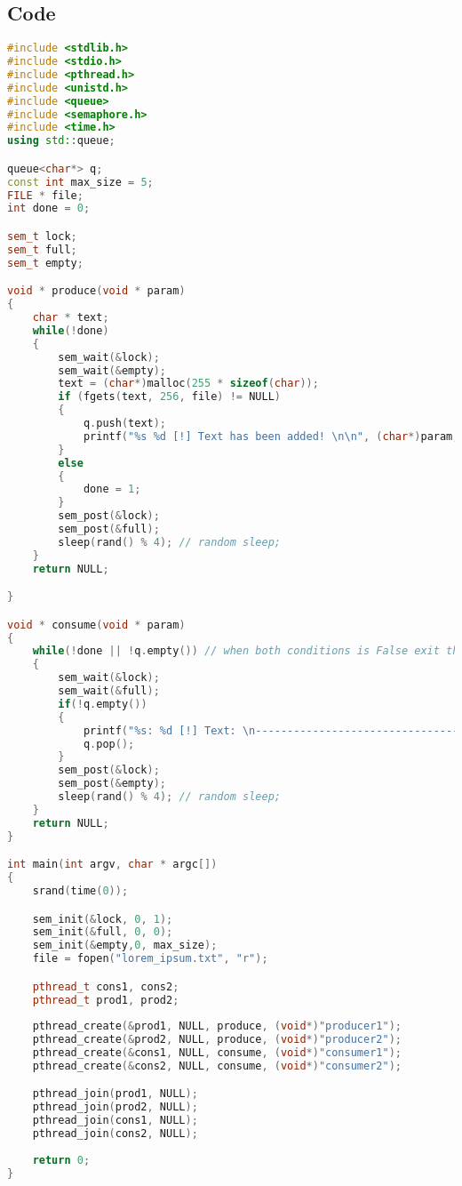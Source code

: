 \documentclass{article}
\begin{document}
\subsection{Code}
\begin{lstlisting}[language=C++]
#include <stdlib.h>
#include <stdio.h>
#include <pthread.h>
#include <unistd.h>
#include <queue>
#include <semaphore.h>
#include <time.h>
using std::queue;

queue<char*> q;
const int max_size = 5;
FILE * file;
int done = 0;

sem_t lock;
sem_t full;
sem_t empty;

void * produce(void * param)
{
	char * text;
	while(!done)
	{
		sem_wait(&lock);
		sem_wait(&empty);
		text = (char*)malloc(255 * sizeof(char));
		if (fgets(text, 256, file) != NULL)
		{
			q.push(text);
			printf("%s %d [!] Text has been added! \n\n", (char*)param, pthread_self());
		}
		else
		{
			done = 1;
		}
		sem_post(&lock);
		sem_post(&full);
		sleep(rand() % 4); // random sleep;
	}
	return NULL;

}

void * consume(void * param)
{
	while(!done || !q.empty()) // when both conditions is False exit the loop;
	{
		sem_wait(&lock);
		sem_wait(&full);
		if(!q.empty())
		{
			printf("%s: %d [!] Text: \n----------------------------------\n %s-------------------------------------\n",(char*)param , pthread_self(), q.front());
			q.pop();
		}
		sem_post(&lock);
		sem_post(&empty);
		sleep(rand() % 4); // random sleep;
	}
	return NULL;
}

int main(int argv, char * argc[])
{
	srand(time(0));

	sem_init(&lock, 0, 1);
	sem_init(&full, 0, 0);
	sem_init(&empty,0, max_size);
	file = fopen("lorem_ipsum.txt", "r");

	pthread_t cons1, cons2;
	pthread_t prod1, prod2;
	
	pthread_create(&prod1, NULL, produce, (void*)"producer1");
	pthread_create(&prod2, NULL, produce, (void*)"producer2");
	pthread_create(&cons1, NULL, consume, (void*)"consumer1");
	pthread_create(&cons2, NULL, consume, (void*)"consumer2");

	pthread_join(prod1, NULL);
	pthread_join(prod2, NULL);
	pthread_join(cons1, NULL);
	pthread_join(cons2, NULL);
	
	return 0;
}
\end{lstlisting}
\end{document}
